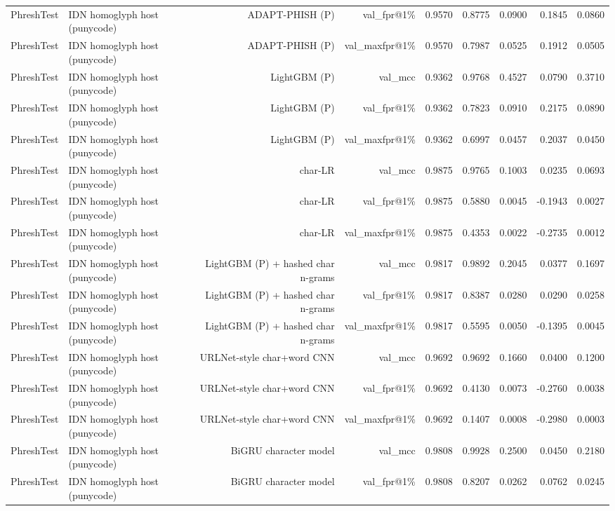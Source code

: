 \begin{table}[t]
\begin{tabular}{llrrrrrrr}
PhreshTest & IDN homoglyph host (punycode) & ADAPT-PHISH (P) & val\_fpr@1\% & 0.9570 & 0.8775 & 0.0900 & 0.1845 & 0.0860 \\
PhreshTest & IDN homoglyph host (punycode) & ADAPT-PHISH (P) & val\_maxfpr@1\% & 0.9570 & 0.7987 & 0.0525 & 0.1912 & 0.0505 \\
PhreshTest & IDN homoglyph host (punycode) & LightGBM (P) & val\_mcc & 0.9362 & 0.9768 & 0.4527 & 0.0790 & 0.3710 \\
PhreshTest & IDN homoglyph host (punycode) & LightGBM (P) & val\_fpr@1\% & 0.9362 & 0.7823 & 0.0910 & 0.2175 & 0.0890 \\
PhreshTest & IDN homoglyph host (punycode) & LightGBM (P) & val\_maxfpr@1\% & 0.9362 & 0.6997 & 0.0457 & 0.2037 & 0.0450 \\
PhreshTest & IDN homoglyph host (punycode) & char-LR & val\_mcc & 0.9875 & 0.9765 & 0.1003 & 0.0235 & 0.0693 \\
PhreshTest & IDN homoglyph host (punycode) & char-LR & val\_fpr@1\% & 0.9875 & 0.5880 & 0.0045 & -0.1943 & 0.0027 \\
PhreshTest & IDN homoglyph host (punycode) & char-LR & val\_maxfpr@1\% & 0.9875 & 0.4353 & 0.0022 & -0.2735 & 0.0012 \\
PhreshTest & IDN homoglyph host (punycode) & LightGBM (P) + hashed char n-grams & val\_mcc & 0.9817 & 0.9892 & 0.2045 & 0.0377 & 0.1697 \\
PhreshTest & IDN homoglyph host (punycode) & LightGBM (P) + hashed char n-grams & val\_fpr@1\% & 0.9817 & 0.8387 & 0.0280 & 0.0290 & 0.0258 \\
PhreshTest & IDN homoglyph host (punycode) & LightGBM (P) + hashed char n-grams & val\_maxfpr@1\% & 0.9817 & 0.5595 & 0.0050 & -0.1395 & 0.0045 \\
PhreshTest & IDN homoglyph host (punycode) & URLNet-style char+word CNN & val\_mcc & 0.9692 & 0.9692 & 0.1660 & 0.0400 & 0.1200 \\
PhreshTest & IDN homoglyph host (punycode) & URLNet-style char+word CNN & val\_fpr@1\% & 0.9692 & 0.4130 & 0.0073 & -0.2760 & 0.0038 \\
PhreshTest & IDN homoglyph host (punycode) & URLNet-style char+word CNN & val\_maxfpr@1\% & 0.9692 & 0.1407 & 0.0008 & -0.2980 & 0.0003 \\
PhreshTest & IDN homoglyph host (punycode) & BiGRU character model & val\_mcc & 0.9808 & 0.9928 & 0.2500 & 0.0450 & 0.2180 \\
PhreshTest & IDN homoglyph host (punycode) & BiGRU character model & val\_fpr@1\% & 0.9808 & 0.8207 & 0.0262 & 0.0762 & 0.0245 \\

\end{tabular}
\end{table}
